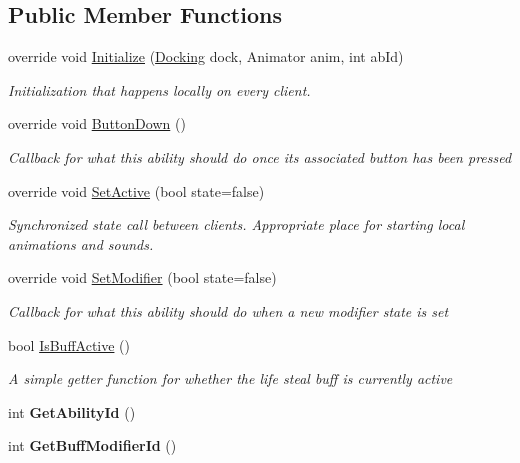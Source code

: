 \subsection*{Public Member Functions}
\begin{DoxyCompactItemize}
\item 
override void \hyperlink{class_life_steal_buff_abdd7a4fb4aaceaae6eaae37c29de24cc}{Initialize} (\hyperlink{class_docking}{Docking} dock, Animator anim, int ab\+Id)
\begin{DoxyCompactList}\small\item\em Initialization that happens locally on every client. \end{DoxyCompactList}\item 
override void \hyperlink{class_life_steal_buff_a22a12c1a3e2dff97bf739a0488001000}{Button\+Down} ()
\begin{DoxyCompactList}\small\item\em Callback for what this ability should do once its associated button has been pressed \end{DoxyCompactList}\item 
override void \hyperlink{class_life_steal_buff_ab5f0d975e5b0e2c0125649c395f20ead}{Set\+Active} (bool state=false)
\begin{DoxyCompactList}\small\item\em Synchronized state call between clients. Appropriate place for starting local animations and sounds. \end{DoxyCompactList}\item 
override void \hyperlink{class_life_steal_buff_a15b4e957b0023ccc3fe6349b721ed822}{Set\+Modifier} (bool state=false)
\begin{DoxyCompactList}\small\item\em Callback for what this ability should do when a new modifier state is set \end{DoxyCompactList}\item 
bool \hyperlink{class_life_steal_buff_ab61088040af2622106129e15d1a6b047}{Is\+Buff\+Active} ()
\begin{DoxyCompactList}\small\item\em A simple getter function for whether the life steal buff is currently active \end{DoxyCompactList}\item 
\hypertarget{class_life_steal_buff_aab07985ca1d8381a0f700205d1f79072}{}\label{class_life_steal_buff_aab07985ca1d8381a0f700205d1f79072} 
int {\bfseries Get\+Ability\+Id} ()
\item 
\hypertarget{class_life_steal_buff_a95bf8dd9e522825a71bd53a5f2a2130e}{}\label{class_life_steal_buff_a95bf8dd9e522825a71bd53a5f2a2130e} 
int {\bfseries Get\+Buff\+Modifier\+Id} ()
\end{DoxyCompactItemize}
